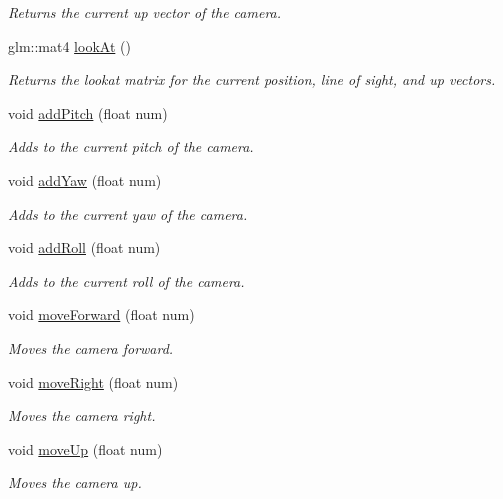 \begin{DoxyCompactItemize}
\begin{DoxyCompactList}\small\item\em Returns the current up vector of the camera. \end{DoxyCompactList}\item 
glm\+::mat4 \hyperlink{class_y_p_r_camera_a6312430157dfe879afee0af5f7759a87}{look\+At} ()
\begin{DoxyCompactList}\small\item\em Returns the lookat matrix for the current position, line of sight, and up vectors. \end{DoxyCompactList}\item 
void \hyperlink{class_y_p_r_camera_ac301ce5ca1503a73cce5aa7a700c62e2}{add\+Pitch} (float num)
\begin{DoxyCompactList}\small\item\em Adds to the current pitch of the camera. \end{DoxyCompactList}\item 
void \hyperlink{class_y_p_r_camera_abca416bb77e38db7526e54e139153554}{add\+Yaw} (float num)
\begin{DoxyCompactList}\small\item\em Adds to the current yaw of the camera. \end{DoxyCompactList}\item 
void \hyperlink{class_y_p_r_camera_a40cd825b06e9d3b361bd3cf7c05d7b2a}{add\+Roll} (float num)
\begin{DoxyCompactList}\small\item\em Adds to the current roll of the camera. \end{DoxyCompactList}\item 
void \hyperlink{class_y_p_r_camera_a3fa6a8dba8cea84cabb9155b030d849e}{move\+Forward} (float num)
\begin{DoxyCompactList}\small\item\em Moves the camera forward. \end{DoxyCompactList}\item 
void \hyperlink{class_y_p_r_camera_a477ddad236b2b2d6cb2c8a7ae60cfa53}{move\+Right} (float num)
\begin{DoxyCompactList}\small\item\em Moves the camera right. \end{DoxyCompactList}\item 
void \hyperlink{class_y_p_r_camera_a37f3668e2f09ec2f7004d016844b468e}{move\+Up} (float num)
\begin{DoxyCompactList}\small\item\em Moves the camera up. \end{DoxyCompactList}\end{DoxyCompactItemize}


